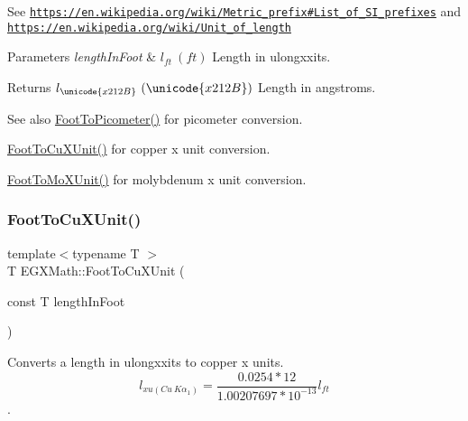 See \href{https://en.wikipedia.org/wiki/Metric_prefix#List_of_SI_prefixes}{\tt https\+://en.\+wikipedia.\+org/wiki/\+Metric\+\_\+prefix\#\+List\+\_\+of\+\_\+\+S\+I\+\_\+prefixes} and \href{https://en.wikipedia.org/wiki/Unit_of_length}{\tt https\+://en.\+wikipedia.\+org/wiki/\+Unit\+\_\+of\+\_\+length} 
\begin{DoxyParams}{Parameters}
{\em length\+In\+Foot} & $ l_{ft}\ (ft)$ Length in ulongxxits. \\
\hline
\end{DoxyParams}
\begin{DoxyReturn}{Returns}
$ l_{\unicode{x212B}}\ (\unicode{x212B})$ Length in angstroms. 
\end{DoxyReturn}
\begin{DoxySeeAlso}{See also}
\mbox{\hyperlink{group___e_g_x_math-_conversions-_length_conversions-_imperial-_foot-_s_i_ga2d46da89e13218f0c8d75356c0d03942}{Foot\+To\+Picometer()}} for picometer conversion. 

\mbox{\hyperlink{group___e_g_x_math-_conversions-_length_conversions-_imperial-_foot-_non-_s_i_ga965e1b5a43bec32129d8319540036be1}{Foot\+To\+Cu\+X\+Unit()}} for copper x unit conversion. 

\mbox{\hyperlink{group___e_g_x_math-_conversions-_length_conversions-_imperial-_foot-_non-_s_i_ga06bc5f701660697593ed1aacd4abd3d6}{Foot\+To\+Mo\+X\+Unit()}} for molybdenum x unit conversion. 
\end{DoxySeeAlso}
\mbox{\label{group___e_g_x_math-_conversions-_length_conversions-_imperial-_foot-_non-_s_i_ga965e1b5a43bec32129d8319540036be1}} 
\subsubsection{\texorpdfstring{Foot\+To\+Cu\+X\+Unit()}{FootToCuXUnit()}}
{\footnotesize\ttfamily template$<$typename T $>$ \\
T E\+G\+X\+Math\+::\+Foot\+To\+Cu\+X\+Unit (\begin{DoxyParamCaption}\item[{const T}]{length\+In\+Foot }\end{DoxyParamCaption})}



Converts a length in ulongxxits to copper x units. \[ l_{xu(Cu\ K\alpha_1)}=\frac{0.0254 * 12}{1.00207697*10^{-13}} l_{ft}\]. 



